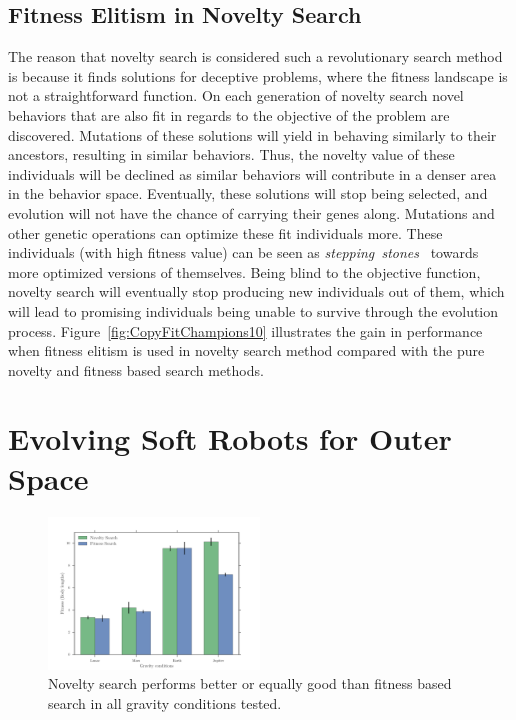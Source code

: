 \documentclass{sig-alternate}
\begin{document}
\subsection{Fitness Elitism in Novelty Search}

The reason that novelty search is considered such a revolutionary search method is because it finds solutions for deceptive problems, where the fitness landscape is not a straightforward function. On each generation of novelty search novel behaviors that are also fit in regards to the objective of the problem are discovered. Mutations of these solutions will yield in behaving similarly to their ancestors, resulting in similar behaviors. Thus, the novelty value of these individuals will be declined as similar behaviors will contribute in a denser area in the behavior space. Eventually, these solutions will stop being selected, and evolution will not have the chance of carrying their genes along. Mutations and other genetic operations can optimize these fit individuals more. These individuals (with high fitness value) can be seen as \emph{stepping~stones}~\cite{lehman2011abandoning} towards more optimized versions of themselves. Being blind to the objective function, novelty search will eventually stop producing new individuals out of them, which will lead to promising individuals being unable to survive through the evolution process. Figure~\ref{fig:CopyFitChampions10} illustrates the gain in performance when fitness elitism is used in novelty search method compared with the pure novelty and fitness based search methods.


\section{Evolving Soft Robots for Outer Space} 

\begin{figure}[b!]
\centering
\includegraphics[width=0.5\textwidth]{../Figures/Results/GravityExperiment.pdf}
\caption{Novelty search performs better or equally good than fitness based search in all gravity conditions tested.}
\label{fig:gravityConditions}
\end{figure}
\end{document}
